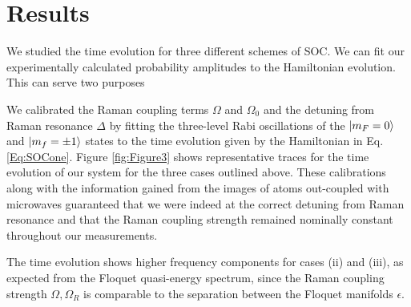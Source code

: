 \section{Results}

We studied the time evolution for three different schemes of SOC. 
We can fit our experimentally calculated probability amplitudes to the Hamiltonian evolution. This can serve two purposes

We calibrated the Raman coupling terms $\Omega$ and $\Omega_0$ and the detuning from Raman resonance $\Delta$ by fitting the three-level Rabi oscillations of the $|m_F=0\rangle$ and $|m_f=\pm 1\rangle$ states to the time evolution given by the Hamiltonian in Eq. \ref{Eq:SOCone}. Figure \ref{fig:Figure3} shows representative traces for the time evolution of our system for the three cases outlined above. These calibrations along with the information gained from the images of atoms out-coupled  with microwaves guaranteed that we were indeed at the correct detuning from Raman resonance and that the Raman coupling strength remained nominally constant throughout our measurements. 




The time evolution shows higher frequency components for cases (ii) and (iii), as expected from the Floquet quasi-energy spectrum, since the Raman coupling strength $\Omega, \Omega_R$ is comparable to the separation between the Floquet manifolds $\epsilon$. 



